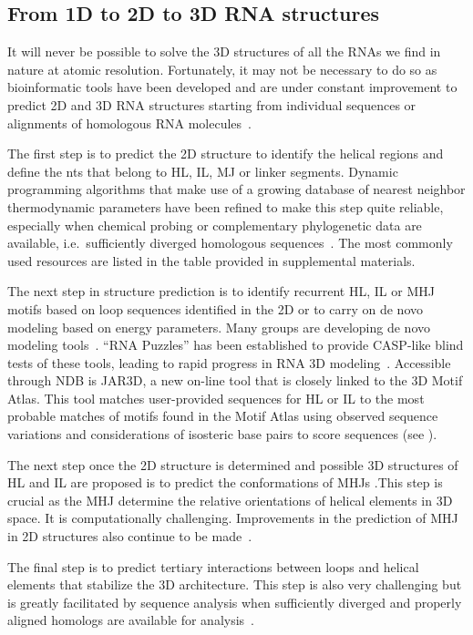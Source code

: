 \subsection{From 1D to 2D to 3D RNA structures}

It will never be possible to solve the 3D structures of all the RNAs we find in
nature at atomic resolution. Fortunately, it may not be necessary to do so as
bioinformatic tools have been developed and are under constant improvement to
predict 2D and 3D RNA structures starting from individual sequences or
alignments of homologous RNA molecules~\cite{Leontis2012e}. 

The first step is to predict the 2D structure to identify the helical regions
and define the nts that belong to HL, IL, MJ or linker segments. Dynamic
programming algorithms that make use of a growing database of nearest neighbor
thermodynamic parameters have been refined to make this step quite reliable,
especially when chemical probing or complementary phylogenetic data are
available, i.e.\ sufficiently diverged homologous sequences~\cite{Aigner2012}.
The most commonly used resources are listed in the table provided in
supplemental materials. 

The next step in structure prediction is to identify recurrent HL, IL or MHJ
motifs based on loop sequences identified in the 2D or to carry on de novo
modeling based on energy parameters. Many groups are developing de novo modeling
tools~\cite{Rother2012a, Sijenyi2012, Flores2012, Ding2012a, Cao2012}. ``RNA
Puzzles'' has been established to provide CASP-like blind tests of these tools,
leading to rapid progress in RNA 3D modeling~\cite{Cruz2012}. Accessible through
NDB is JAR3D, a new on-line tool that is closely linked to the 3D Motif Atlas.
This tool matches user-provided sequences for HL or IL to the most probable
matches of motifs found in the Motif Atlas using observed sequence variations
and considerations of isosteric base pairs to score sequences (see
).

The next step once the 2D structure is determined and possible 3D structures of
HL and IL are proposed is to predict the conformations of MHJs
\cite{Lamiable2012, Laing2011}.This step is crucial as the MHJ determine the
relative orientations of helical elements in 3D space. It is computationally
challenging. Improvements in the prediction of MHJ in 2D structures also
continue to be made~\cite{Liu2011b}.

The final step is to predict tertiary interactions between loops and helical
elements that stabilize the 3D architecture. This step is also very challenging
but is greatly facilitated by sequence analysis when sufficiently diverged and
properly aligned homologs are available for analysis~\cite{Michel2000,
Westhof2011}.

